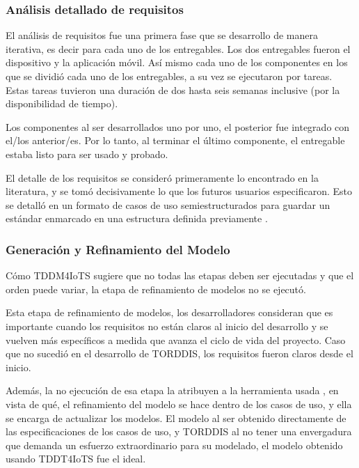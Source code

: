			\subsubsection{Análisis detallado de requisitos}
				El análisis de requisitos fue una primera fase que se desarrollo de manera iterativa, es decir para cada uno de los entregables. Los dos entregables fueron el dispositivo y la aplicación móvil. Así mismo cada uno de los componentes en los que se dividió cada uno de los entregables, a su vez se ejecutaron por tareas. Estas tareas tuvieron una duración de dos hasta seis semanas inclusive (por la disponibilidad de tiempo).
			
				Los componentes al ser desarrollados uno por uno, el posterior fue integrado con el/los anterior/es. Por lo tanto, al terminar el último componente, el entregable estaba listo para ser usado y probado.
			
				El detalle de los requisitos se consideró primeramente lo encontrado en la literatura, y se tomó decisivamente lo que los futuros usuarios especificaron. Esto se detalló en un formato de casos de uso semiestructurados para guardar un estándar enmarcado en una estructura definida previamente \citep{Zegzhda2018Use}.
			
			\subsubsection{Generación y Refinamiento del Modelo}
				Cómo TDDM4IoTS \citep{Guerrero-Ulloa2020TDDM4IoTS} sugiere que no todas las etapas deben ser ejecutadas y que el orden puede variar, la etapa de refinamiento de modelos no se ejecutó.
			
				Esta etapa de refinamiento de modelos, los desarrolladores consideran que es importante cuando los requisitos no están claros al inicio del desarrollo y se vuelven más específicos a medida que avanza el ciclo de vida del proyecto. Caso que no sucedió en el desarrollo de TORDDIS, los requisitos fueron claros desde el inicio.
			
				Además, la no ejecución de esa etapa la atribuyen a la herramienta usada \citep{Guerrero2024Test}, en vista de qué, el refinamiento del modelo se hace dentro de los casos de uso, y ella se encarga de actualizar los modelos. El modelo al ser obtenido directamente de las especificaciones de los casos de uso, y TORDDIS al no tener una envergadura que demanda un esfuerzo extraordinario para su modelado, el modelo obtenido usando TDDT4IoTS fue el ideal.
			
